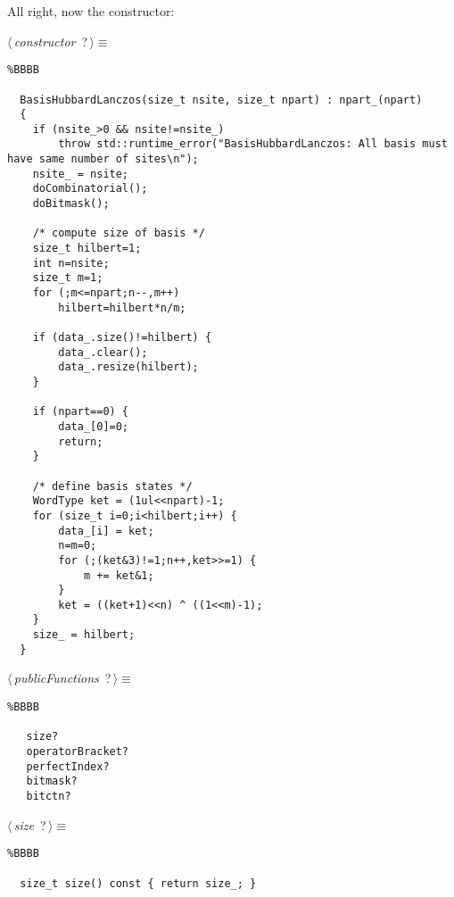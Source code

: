 \documentclass{report}
\begin{document}
All right, now the constructor:
\begin{flushleft} \small
\begin{minipage}{\linewidth}\label{scrap6}\raggedright\small
{} $\langle\,${\it constructor}\nobreak\ {\footnotesize {?}}$\,\rangle\equiv$
\begin{lstlisting}%BBBB
    
  BasisHubbardLanczos(size_t nsite, size_t npart) : npart_(npart)  
  {  
  	if (nsite_>0 && nsite!=nsite_)  
  		throw std::runtime_error("BasisHubbardLanczos: All basis must have same number of sites\n");  
  	nsite_ = nsite;  
  	doCombinatorial();  
  	doBitmask();  
    
  	/* compute size of basis */  
  	size_t hilbert=1;  
  	int n=nsite;  
  	size_t m=1;  
  	for (;m<=npart;n--,m++)  
  		hilbert=hilbert*n/m;  
    
  	if (data_.size()!=hilbert) {  
  		data_.clear();  
  		data_.resize(hilbert);  
  	}  
    
  	if (npart==0) {  
  		data_[0]=0;  
  		return;  
  	}  
  	  
  	/* define basis states */  
  	WordType ket = (1ul<<npart)-1;  
  	for (size_t i=0;i<hilbert;i++) {  
  		data_[i] = ket;  
  		n=m=0;  
  		for (;(ket&3)!=1;n++,ket>>=1) {  
  			m += ket&1;  
  		}  
  		ket = ((ket+1)<<n) ^ ((1<<m)-1);  
  	}  
  	size_ = hilbert;  
  }  \end{lstlisting}
\end{minipage}\vspace{4ex}
\end{flushleft}
\begin{flushleft} \small
\begin{minipage}{\linewidth}\label{scrap7}\raggedright\small
{} $\langle\,${\it publicFunctions}\nobreak\ {\footnotesize {?}}$\,\rangle\equiv$
\begin{lstlisting}%BBBB
    
   size?  
   operatorBracket?  
   perfectIndex?  
   bitmask?  
   bitctn?  \end{lstlisting}
\end{minipage}\vspace{4ex}
\end{flushleft}
\begin{flushleft} \small
\begin{minipage}{\linewidth}\label{scrap8}\raggedright\small
{} $\langle\,${\it size}\nobreak\ {\footnotesize {?}}$\,\rangle\equiv$
\begin{lstlisting}%BBBB
    
  size_t size() const { return size_; }  \end{lstlisting}
\end{minipage}\vspace{4ex}
\end{flushleft}
\end{document}
